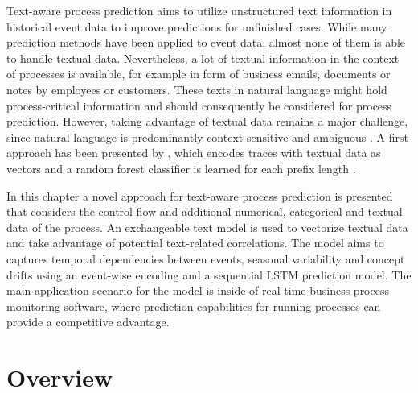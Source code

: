 Text-aware process prediction aims to utilize unstructured text information in historical event data to improve predictions for unfinished cases.
While many prediction methods have been applied to event data, almost none of them is able to handle textual data.
Nevertheless, a lot of textual information in the context of processes is available, for example in form of business emails, documents or notes by employees or customers.
These texts in natural language might hold process-critical information and should consequently be considered for process prediction.
However, taking advantage of textual data remains a major challenge, since natural language is predominantly context-sensitive and ambiguous  \cite{textminingissues}.
A first approach has been presented by \citeauthor{DBLP:conf/bpm/TeinemaaDMF16}, which encodes traces with textual data as vectors and a random forest classifier is learned for each prefix length \cite{DBLP:conf/bpm/TeinemaaDMF16}.

In this chapter a novel approach for text-aware process prediction is presented that considers the control flow and additional numerical, categorical and textual data of the process.
An exchangeable text model is used to vectorize textual data and take advantage of potential text-related correlations.
The model aims to captures temporal dependencies between events, seasonal variability and concept drifts using an event-wise encoding and a sequential LSTM prediction model.
The main application scenario for the model is inside of real-time business process monitoring software, where prediction capabilities for running processes can provide a competitive advantage.

\section{Overview}\label{sec:overview}


